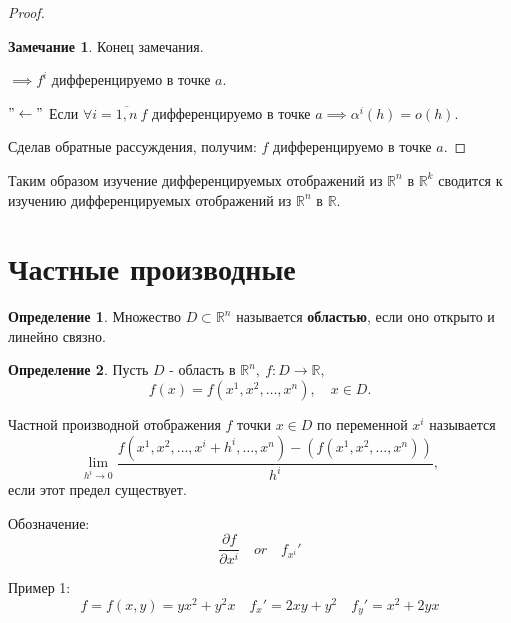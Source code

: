 \documentclass{report}
\theoremstyle{definition}
\newtheorem{definition}{Определение}[section]
\newtheorem*{remark}{Замечание}
\begin{document}
\begin{proof}
\begin{remark}
  Конец замечания.
  \end{remark}

  $\implies f^i$ дифференцируемо в точке $a$.

  $"\leftarrow"$ Если $\forall i = \overline{1,n} \ f$ дифференцируемо в точке $a \implies \alpha^i(h) = o(h)$.

  Сделав обратные рассуждения, получим: $f$ дифференцируемо в точке $a$.
\end{proof}

Таким образом изучение дифференцируемых отображений из $\mathbb{R}^n$ в $\mathbb{R}^k$ сводится к изучению
дифференцируемых отображений из $\mathbb{R}^n$ в $\mathbb{R}$.

\section{Частные производные}

\begin{definition}
  Множество $D\subset\mathbb{R}^n$ называется \textbf{областью}, если оно открыто и линейно связно.
\end{definition}

\begin{definition}
  Пусть $D$ - область в $\mathbb{R}^n, \ f:D\rightarrow\mathbb{R},$
  \begin{equation*}
    f(x) = f(x^1,x^2,\ldots,x^n), \quad x \in D.
  \end{equation*}

  Частной производной отображения $f$ точки $x \in D$ по переменной $x^i$ называется
  \begin{equation*}
    \underset{h^i\rightarrow 0}{\lim}\frac{f(x^1,x^2,\ldots,x^i + h^i, \ldots,x^n) - (f(x^1,x^2,\ldots,x^n))}{h^i},
  \end{equation*}
  если этот предел существует.

  Обозначение:
  \begin{equation*}
    \frac{\partial f}{\partial x^i} \quad or \quad f_{x^i}'
  \end{equation*}
\end{definition}

Пример 1:
  \begin{equation*}
    f = f(x,y) = yx^2 + y^2x \quad f_x' = 2xy + y^2 \quad f_y' = x^2 + 2yx
  \end{equation*}
\end{document}
